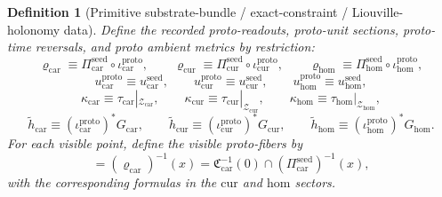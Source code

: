 \documentclass[11pt]{article}
\newcommand{\TensorProtoSpace}{\mathcal Z_{\mathrm{car}}}
\newcommand{\CurProtoSpace}{\mathcal Z_{\mathrm{cur}}}
\newcommand{\HomProtoSpace}{\mathcal Z_{\mathrm{hom}}}
\newcommand{\TensorProtoRead}{\varrho_{\mathrm{car}}}
\newcommand{\CurProtoRead}{\varrho_{\mathrm{cur}}}
\newcommand{\HomProtoRead}{\varrho_{\mathrm{hom}}}
\newcommand{\TensorProtoUnit}{u_{\mathrm{car}}^{\mathrm{proto}}}
\newcommand{\CurProtoUnit}{u_{\mathrm{cur}}^{\mathrm{proto}}}
\newcommand{\HomProtoUnit}{u_{\mathrm{hom}}^{\mathrm{proto}}}
\newcommand{\TensorProtoTimeRev}{\kappa_{\mathrm{car}}}
\newcommand{\CurProtoTimeRev}{\kappa_{\mathrm{cur}}}
\newcommand{\HomProtoTimeRev}{\kappa_{\mathrm{hom}}}
\newcommand{\TensorProtoAmbientMetric}{\widetilde h_{\mathrm{car}}}
\newcommand{\CurProtoAmbientMetric}{\widetilde h_{\mathrm{cur}}}
\newcommand{\HomProtoAmbientMetric}{\widetilde h_{\mathrm{hom}}}
\newcommand{\TensorSeedRead}{\Pi_{\mathrm{car}}^{\mathrm{seed}}}
\newcommand{\CurSeedRead}{\Pi_{\mathrm{cur}}^{\mathrm{seed}}}
\newcommand{\HomSeedRead}{\Pi_{\mathrm{hom}}^{\mathrm{seed}}}
\newcommand{\TensorSeedUnit}{u_{\mathrm{car}}^{\mathrm{seed}}}
\newcommand{\CurSeedUnit}{u_{\mathrm{cur}}^{\mathrm{seed}}}
\newcommand{\HomSeedUnit}{u_{\mathrm{hom}}^{\mathrm{seed}}}
\newcommand{\TensorSeedTimeRev}{\tau_{\mathrm{car}}}
\newcommand{\CurSeedTimeRev}{\tau_{\mathrm{cur}}}
\newcommand{\HomSeedTimeRev}{\tau_{\mathrm{hom}}}
\newcommand{\TensorSeedMetric}{G_{\mathrm{car}}}
\newcommand{\CurSeedMetric}{G_{\mathrm{cur}}}
\newcommand{\HomSeedMetric}{G_{\mathrm{hom}}}
\newcommand{\TensorConstraintMap}{\mathfrak C_{\mathrm{car}}}
\newcommand{\TensorProtoInc}{\iota_{\mathrm{car}}^{\mathrm{proto}}}
\newcommand{\CurProtoInc}{\iota_{\mathrm{cur}}^{\mathrm{proto}}}
\newcommand{\HomProtoInc}{\iota_{\mathrm{hom}}^{\mathrm{proto}}}
\newtheorem{definition}{Definition}
\begin{document}
\begin{definition}[Primitive substrate-bundle / exact-constraint / Liouville-holonomy data]
Define the recorded proto-readouts, proto-unit sections, proto-time reversals, and proto ambient metrics by restriction:
\begin{equation}
\TensorProtoRead\equiv \TensorSeedRead\circ\TensorProtoInc,\qquad
\CurProtoRead\equiv \CurSeedRead\circ\CurProtoInc,\qquad
\HomProtoRead\equiv \HomSeedRead\circ\HomProtoInc,
\label{eq:proto_read_from_seed}
\end{equation}
\begin{equation}
\TensorProtoUnit\equiv \TensorSeedUnit,\qquad
\CurProtoUnit\equiv \CurSeedUnit,\qquad
\HomProtoUnit\equiv \HomSeedUnit,
\label{eq:proto_unit_from_seed}
\end{equation}
\begin{equation}
\TensorProtoTimeRev\equiv \TensorSeedTimeRev|_{\TensorProtoSpace},\qquad
\CurProtoTimeRev\equiv \CurSeedTimeRev|_{\CurProtoSpace},\qquad
\HomProtoTimeRev\equiv \HomSeedTimeRev|_{\HomProtoSpace},
\label{eq:proto_time_rev_from_seed}
\end{equation}
\begin{equation}
\TensorProtoAmbientMetric\equiv (\TensorProtoInc)^*\TensorSeedMetric,\qquad
\CurProtoAmbientMetric\equiv (\CurProtoInc)^*\CurSeedMetric,\qquad
\HomProtoAmbientMetric\equiv (\HomProtoInc)^*\HomSeedMetric.
\label{eq:proto_metric_from_seed}
\end{equation}
For each visible point, define the visible proto-fibers by
\begin{equation}
=(\TensorProtoRead)^{-1}(x)
=
\TensorConstraintMap^{-1}(0)\cap(\TensorSeedRead)^{-1}(x),
\label{eq:proto_fiber_from_seed_car}
\end{equation}
with the corresponding formulas in the \(\mathrm{cur}\) and \(\mathrm{hom}\) sectors.
\end{definition}
\end{document}
